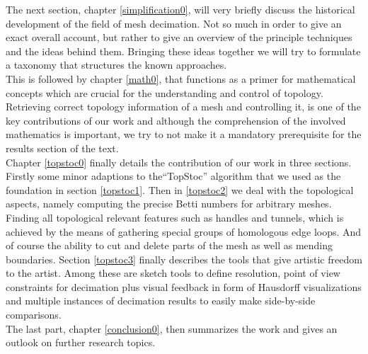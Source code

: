 The next section, chapter \ref{simplification0}, will very briefly discuss the historical development of the field of mesh decimation.
Not so much in order to give an exact overall account, but rather to give an overview of the principle techniques and the ideas behind them.
Bringing these ideas together we will try to formulate a taxonomy that structures the known approaches.\\ 
This is followed by chapter \ref{math0}, that functions as a primer for mathematical concepts which are crucial for the understanding and control of topology.
Retrieving correct topology information of a mesh and controlling it, is one of the key contributions of our work and although the comprehension of the involved mathematics is important, we try to not make it a mandatory prerequisite for the results section of the text.\\
Chapter \ref{topstoc0} finally details the contribution of our work in three sections.
Firstly some minor adaptions to the``TopStoc'' algorithm that we used as the foundation in section \ref{topstoc1}.
Then in \ref{topstoc2} we deal with the topological aspects, namely computing the precise Betti numbers for arbitrary meshes.
Finding all topological relevant features such as handles and tunnels, which is achieved by the means of gathering special groups of homologous edge loops.
And of course the ability to cut and delete parts of the mesh as well as mending boundaries.
Section \ref{topstoc3} finally describes the tools that give artistic freedom to the artist.
Among these are sketch tools to define resolution, point of view constraints for decimation plus visual feedback in form of Hausdorff visualizations and multiple instances of decimation results to easily make side-by-side comparisons.\\
The last part, chapter \ref{conclusion0}, then summarizes the work and gives an outlook on further research topics.
